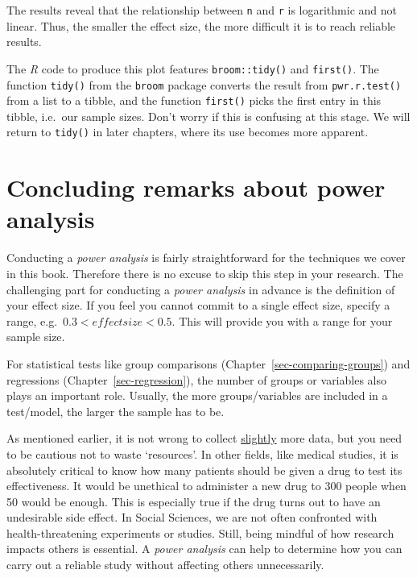 \documentclass[
  letterpaper,
]{krantz}
\begin{document}
The results reveal that the relationship between \texttt{n} and
\texttt{r} is logarithmic and not linear. Thus, the smaller the effect
size, the more difficult it is to reach reliable results.

The \emph{R} code to produce this plot features \texttt{broom::tidy()}
and \texttt{first()}. The function \texttt{tidy()} from the
\texttt{broom} package converts the result from \texttt{pwr.r.test()}
from a list to a tibble, and the function \texttt{first()} picks the
first entry in this tibble, i.e.~our sample sizes. Don't worry if this
is confusing at this stage. We will return to \texttt{tidy()} in later
chapters, where its use becomes more apparent.

\section{Concluding remarks about power
analysis}\label{concluding-remarks-about-power-analysis}

Conducting a \emph{power analysis} is fairly straightforward for the
techniques we cover in this book. Therefore there is no excuse to skip
this step in your research. The challenging part for conducting a
\emph{power analysis} in advance is the definition of your effect size.
If you feel you cannot commit to a single effect size, specify a range,
e.g.~\(0.3 < effect size < 0.5\). This will provide you with a range for
your sample size.

For statistical tests like group comparisons
(Chapter~\ref{sec-comparing-groups}) and regressions
(Chapter~\ref{sec-regression}), the number of groups or variables also
plays an important role. Usually, the more groups/variables are included
in a test/model, the larger the sample has to be.

As mentioned earlier, it is not wrong to collect \ul{slightly} more
data, but you need to be cautious not to waste `resources'. In other
fields, like medical studies, it is absolutely critical to know how many
patients should be given a drug to test its effectiveness. It would be
unethical to administer a new drug to 300 people when 50 would be
enough. This is especially true if the drug turns out to have an
undesirable side effect. In Social Sciences, we are not often confronted
with health-threatening experiments or studies. Still, being mindful of
how research impacts others is essential. A \emph{power analysis} can
help to determine how you can carry out a reliable study without
affecting others unnecessarily.
\end{document}

